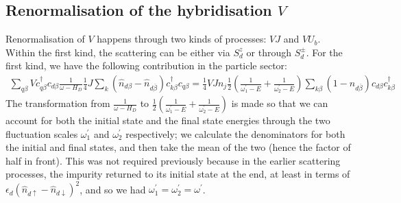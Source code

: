 \documentclass[reprint,superscriptaddress,floatfix]{revtex4-2}
\begin{document}
\begin{widetext}
\subsection{Renormalisation of the hybridisation \(V\)}
Renormalisation of \(V\) happens through two kinds of processes: \(VJ\) and \(VU_b\). Within the first kind, the scattering can be either via \(S_d^z\) or through \(S_d^\pm\). For the first kind, we have the following contribution in the particle sector:
\begin{equation}\begin{aligned}
	\sum_{q\beta} Vc^\dagger_{q\beta} c_{d\beta} \frac{1}{\omega - H_D}\frac{1}{4}J \sum_{k} \left(\hat n_{d\beta} - \hat n_{d\overline\beta}\right) c^\dagger_{k\beta}c_{q\beta} = \frac{1}{4}V J n_j \frac{1}{2}\left(\frac{1}{\omega^\prime_1 - E} + \frac{1}{\omega^\prime_2 - E}\right)\sum_{k\beta} \left(1 - \hat n_{d\overline\beta}\right) c_{d\beta}c^\dagger_{k\beta}
\end{aligned}\end{equation}
The transformation from \(\frac{1}{\omega - H_D}\) to \(\frac{1}{2}\left(\frac{1}{\omega^\prime_1 - E} + \frac{1}{\omega^\prime_2 - E}\right)\) is made so that we can account for both the initial state and the final state energies through the two fluctuation scales \(\omega^\prime_1\) and \(\omega_2^\prime\) respectively; we calculate the denominators for both the initial and final states, and then take the mean of the two (hence the factor of half in front). This was not required previously because in the earlier scattering processes, the impurity returned to its initial state at the end, at least in terms of \(\epsilon_d \left( \hat n_{d \uparrow} - \hat n_{d \downarrow} \right)^2 \), and so we had \(\omega_1^\prime = \omega_2^\prime = \omega^\prime\).


\end{widetext}
\end{document}
